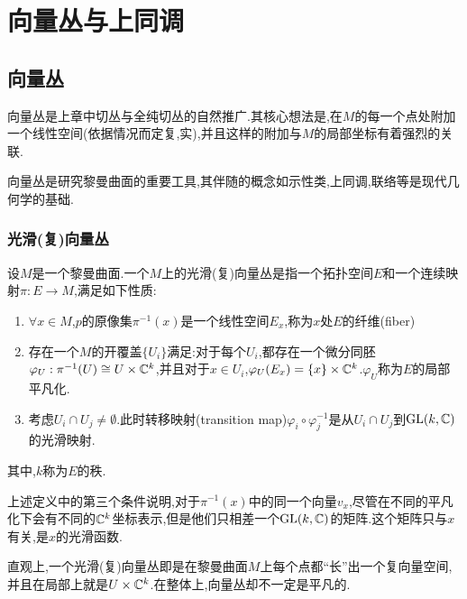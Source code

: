 
\chapter{向量丛与上同调}
\section{向量丛}
向量丛是上章中切丛与全纯切丛的自然推广.其核心想法是,在$M$的每一个点处附加一个线性空间(依据情况而定复,实),并且这样的附加与$M$的局部坐标有着强烈的关联.

向量丛是研究黎曼曲面的重要工具,其伴随的概念如示性类,上同调,联络等是现代几何学的基础.
\subsection*{光滑(复)向量丛}
\begin{definition}
	设$M$是一个黎曼曲面.一个$M$上的光滑(复)向量丛是指一个拓扑空间$E$和一个连续映射$\pi:E \to M$,满足如下性质:
	\begin{enumerate}
		\item $\forall x\in M$,$p$的原像集$\pi^{-1}(x)$是一个线性空间$E_x$,称为$x$处$E$的纤维(fiber)
		\item 存在一个$M$的开覆盖$\{U_i\}$满足:对于每个$U_i$,都存在一个微分同胚$\varphi_U:\pi^{-1}(U)\cong U\times \mathbb{C}^k$,并且对于$x \in U_i$,$\varphi_U(E_x)=\{x\}\times \mathbb{C}^k$.$\varphi_U$称为$E$的局部平凡化.
		\item 考虑$U_i\cap U_j\neq \emptyset$.此时转移映射(transition map)$\varphi_i \circ \varphi_j^{-1}$是从$U_i\cap U_j$到$\mathrm{GL}(k,\mathbb{C})$的光滑映射.
	\end{enumerate}
	其中,$k$称为$E$的秩.
\end{definition}
上述定义中的第三个条件说明,对于$\pi^{-1}(x)$中的同一个向量$v_x$,尽管在不同的平凡化下会有不同的$\mathbb{C}^k$坐标表示,但是他们只相差一个$\mathrm{GL}(k,\mathbb{C})$的矩阵.这个矩阵只与$x$有关,是$x$的光滑函数.

直观上,一个光滑(复)向量丛即是在黎曼曲面$M$上每个点都“长”出一个复向量空间,并且在局部上就是$U\times \mathbb{C}^k$.在整体上,向量丛却不一定是平凡的.

